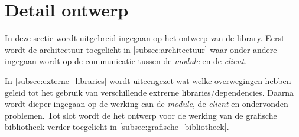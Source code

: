 \section{Detail ontwerp} \label{sec:detail}

In deze sectie wordt uitgebreid ingegaan op het ontwerp van de library. Eerst wordt de architectuur toegelicht in \autoref{subsec:architectuur} waar onder andere ingegaan wordt op de communicatie tussen de \emph{module} en de \emph{client}.

In \autoref{subsec:externe_libraries} wordt uiteengezet wat welke overwegingen hebben geleid tot het gebruik van verschillende extrerne libraries/dependencies. Daarna wordt dieper ingegaan op de werking can de \emph{module}, de \emph{client} en ondervonden problemen. Tot slot wordt de het ontwerp voor de werking van de grafische bibliotheek verder toegelicht in \autoref{subsec:grafische_bibliotheek}.







